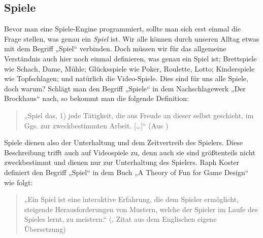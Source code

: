 \subsection{Spiele}	

Bevor man eine Spiele-Engine programmiert, sollte man sich erst einmal die Frage stellen, was genau ein \textit{Spiel} ist. Wir alle können durch unseren Alltag etwas mit dem Begriff „Spiel“ verbinden. Doch müssen wir für das allgemeine Verständnis auch hier noch einmal definieren, was genau ein Spiel ist;
Brettspiele wie Schach, Dame, Mühle; Glücksspiele wie Poker, Roulette, Lotto; Kinderspiele wie Topfschlagen; und natürlich die Video-Spiele. 
Dies sind für uns alle Spiele, doch warum?
Schlägt man den Begriff „Spiele“ in dem Nachschlagewerk „Der Brockhaus“ nach, so bekommt man die folgende Definition:

\begin{quote}
	„Spiel das, 1) jede Tätigkeit, die aus Freude an dieser selbst geschieht, im Ggs. zur zweckbestimmten Arbeit. […]“ (Aus \cite{brockhaus})
\end{quote}

Spiele dienen also der Unterhaltung und dem Zeitvertreib des Spielers.
Diese Beschreibung trifft auch auf Videospiele zu, denn auch sie sind größtenteils nicht zweckbestimmt und dienen nur zur Unterhaltung des Spielers.
Raph Koster definiert den Begriff „Spiel“ in dem Buch „A Theory
of Fun for Game Design“ wie folgt:

\begin{quote}
	„Ein Spiel ist eine interaktive Erfahrung, die dem Spieler ermöglicht, steigende Herausforderungen von Mustern, welche der Spieler im Laufe des Spieles lernt, zu meistern.“
	(\cite{theoryoffun}, Zitat aus dem Englischen eigene Übersetzung)
\end{quote}
